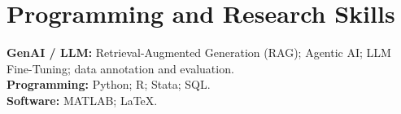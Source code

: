 \section*{Programming and Research Skills}

\textbf{GenAI / LLM:} Retrieval-Augmented Generation (RAG); Agentic AI; LLM Fine-Tuning; data annotation and evaluation.\\
\textbf{Programming:} Python; R; Stata; SQL.\\
\textbf{Software:} MATLAB; LaTeX.

